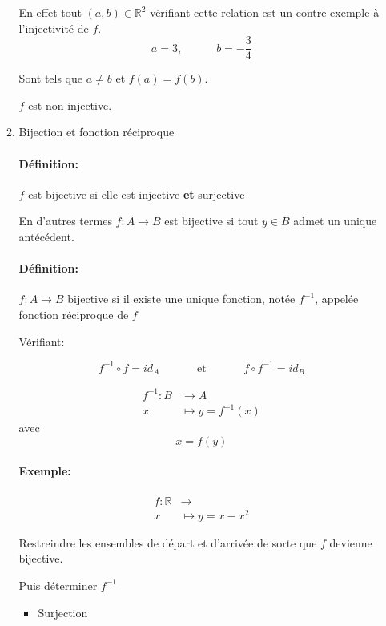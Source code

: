 \documentclass[
    11pt,
    a4paper,
    oneside,
    headinlcude, footinclude,
    twoside,
]{report}
\begin{document}
\begin{enumerate}
\begin{enumerate}
En effet tout $(a, b) \in \mathbb{R}^{2}$ vérifiant cette
relation est un contre-exemple à l'injectivité de $f$. $$a =
3, \quad \quad \quad b = - \frac{3}{4}$$

Sont tels que $a \neq b$ et $f(a) = f(b)$.

$f$ est non injective.
                
\item Bijection et fonction réciproque

\paragraph{Définition:}
                
$f$ est bijective si elle est injective \textbf{et} surjective

En d'autres termes $f : A \to B$ est bijective si tout $y \in
B$  admet un unique antécédent.

\paragraph{Définition:}
                
$f: A \to B$ bijective si il existe une unique fonction, notée
$f^{-1}$, appelée fonction réciproque de $f$ 

Vérifiant:

$$f^{-1} \circ f = id_{A} \quad \quad \quad \text{ et } \quad
\quad \quad f \circ f^{-1} = id_{B}$$

\[
\begin{split}
f^{-1} : B &\to A\\
x &\mapsto y = f^{-1}(x)
\end{split}
\]
avec
$$x = f(y)$$

\paragraph{Exemple:}
                
\[
\begin{split}
f : \mathbb{R} &\to \mathbb{}\\
x &\mapsto y = x - x^{2}
\end{split}
\]

Restreindre les ensembles de départ et d'arrivée de sorte que
$f$ devienne bijective.

Puis déterminer $f^{-1}$ 

\begin{itemize}
\item Surjection


\end{itemize}
\end{enumerate}
\end{enumerate}
\end{document}
